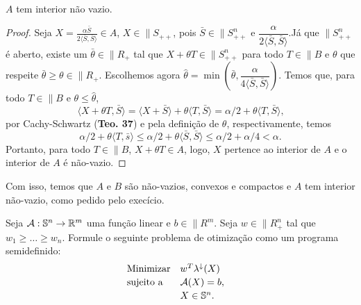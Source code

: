 \begin{homeworkProblemAnswer}
\begin{prop}
$A$ tem interior não vazio.
\end{prop}
\begin{proof}
Seja $\displaystyle X = \frac{\alpha \bar{S}}{2 \langle \bar{S}, \bar{S} \rangle} \in A$, $X \in \|{S}_{++}$, pois $\bar{S} \in \|{S}_{++}^n$ e $\dfrac{\alpha}{2 \langle \bar{S}, \bar{S} \rangle}$.Já que $\|{S}_{++}^n$ é aberto, existe um $\bar{\theta} \in \|{R}_+$ tal que $X + \theta T \in \|{S}_{++}^n$ para todo $T \in \|{B}$ e $\theta$ que respeite $\bar{\theta} \geq \theta \in \|{R}_+$. Escolhemos agora $\hat{\theta} = \min(\bar{\theta}, \dfrac{\alpha}{4\langle \bar{S}, \bar{S} \rangle})$. Temos que, para todo $T \in \|{B}$ e $\theta \leq \hat{\theta}$,
$$ \langle X + \theta T, \bar{S} \rangle = \langle X + \bar{S} \rangle + \theta \langle T, \bar{S} \rangle = \alpha/2 + \theta \langle T, \bar{S} \rangle \text{,} $$
por Cachy-Schwartz (\textbf{Teo. 37}) e pela definição de $\theta$, respectivamente, temos
$$ \alpha/2 + \theta \langle T, \bar{s} \rangle \leq \alpha/2 + \theta \langle \bar{S}, \bar{S} \rangle \leq \alpha/2 + \alpha/4 < \alpha \text{.}$$
Portanto, para todo $T \in \|{B}$, $X + \theta T \in A$, logo, $X$ pertence ao interior de $A$ e o interior de $A$ é não-vazio.
\end{proof}

Com isso, temos que $A$ e $B$ são não-vazios, convexos e compactos e $A$ tem interior não-vazio, como pedido pelo execício.
\end{homeworkProblemAnswer}

\begin{homeworkProblem}
Seja $\"{A}: \|{S}^n \rightarrow \|{R}^m$ uma função linear e $b \in \|{R}^m$. Seja $w \in \|{R}_+^n$ tal que $w_1 \geq \dots \geq w_n$. Formule o seguinte problema de otimização como um programa semidefinido:
\begin{equation*}
    \begin{array}[!h]{lll}
        \text{Minimizar} & w^T \eigen(X)                                    & \\[2pt]
        \text{sujeito a} & \"{A}(X) = b,                                    & \\[2pt]
                         & X \in \|{S}^n.                                   & \\
    \end{array}
\end{equation*}
\end{homeworkProblem}

